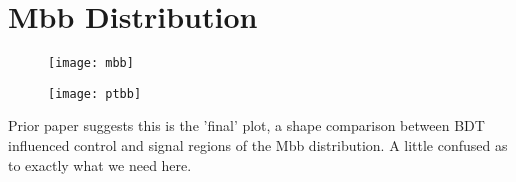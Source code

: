 \section{Mbb Distribution}

		\begin{figure}[h]
			\centering
			\begin{minipage}[h]{0.45\linewidth}
				\texttt{[image: mbb]}
				\caption{}
				\label{fig:bdtmbb}
			\end{minipage}
			\quad
			\begin{minipage}[h]{0.45\linewidth}
				\texttt{[image: ptbb]}
				\caption{}
				\label{fig:bdtptbb}
			\end{minipage}
		\end{figure}

	Prior paper suggests this is the 'final' plot, a shape comparison between BDT influenced control and signal regions of the Mbb distribution. A little confused as to exactly what we need here.

\endinput
